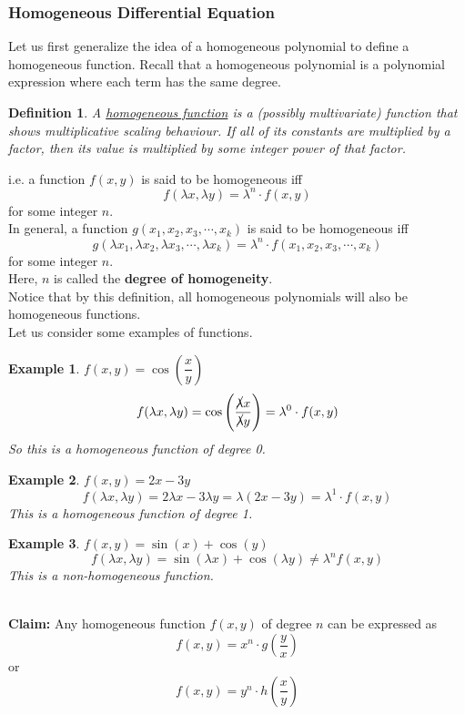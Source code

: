 \documentclass[14]{article}
\newtheorem{define}{Definition}
\newtheorem*{ex}{Example}
\theoremstyle{definition}
\theoremstyle{case}
\begin{document}
\subsubsection{Homogeneous Differential Equation}
Let us first generalize the idea of a homogeneous polynomial to define a homogeneous function. Recall that a homogeneous polynomial is a polynomial expression where each term has the same degree.
\begin{define}
A \underline{homogeneous function} is a (possibly multivariate) function that shows multiplicative scaling behaviour. If all of its constants are multiplied by a factor, then its value is multiplied by some integer power of that factor.
\end{define}
i.e. a function $f(x, y)$ is said to be homogeneous iff
\[f(\lambda x, \lambda y) = \lambda^n \cdot f(x, y)\]
for some integer $n$.\\
In general, a function $g(x_1, x_2, x_3, \cdots, x_k)$ is said to be homogeneous iff
\[g(\lambda x_1, \lambda x_2, \lambda x_3, \cdots, \lambda x_k) = \lambda^n \cdot f(x_1, x_2, x_3, \cdots, x_k)\]
for some integer $n$.\\
Here, $n$ is called the \textbf{degree of homogeneity}.\\
Notice that by this definition, all homogeneous polynomials will also be homogeneous functions.\\
Let us consider some examples of functions.\\
\begin{ex}
$f(x, y) = \cos\left(\dfrac{x}{y}\right)$
\[f(\lambda x, \lambda y) = \cos\left( \dfrac{\cancel{\lambda} x}{\cancel{\lambda} y} \right) = \lambda^0 \cdot f(x, y)\]
So this is a homogeneous function of degree 0.
\end{ex}
\begin{ex}
$f(x, y) = 2x - 3y$
\[f(\lambda x, \lambda y) = 2\lambda x - 3\lambda y = \lambda(2x-3y) = \lambda^1 \cdot f(x, y)\]
This is a homogeneous function of degree 1.
\end{ex}
\begin{ex}
$f(x, y) = \sin(x) + \cos(y)$
\[f(\lambda x, \lambda y) = \sin(\lambda x) + \cos(\lambda y) \neq \lambda^n f(x, y)\]
This is a non-homogeneous function.
\pagebreak
\end{ex}\text{}\\
\textbf{Claim:} Any homogeneous function $f(x, y)$ of degree $n$ can be expressed as
\[f(x, y) = x^n \cdot g\left(\dfrac{y}{x}\right)\]
or
\[f(x, y) = y^n \cdot h\left(\dfrac{x}{y}\right)\]
\end{document}
